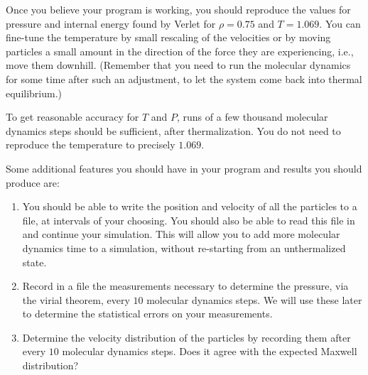 Once you believe your program is working, you should reproduce the values for pressure and
internal energy found by Verlet for $\rho = 0.75$ and $T = 1.069$. You can fine-tune the
temperature by small rescaling of the velocities or by moving particles a small amount in
the direction of the force they are experiencing, i.e., move them downhill. (Remember that
you need to run the molecular dynamics for some time after such an adjustment, to let the
system come back into thermal equilibrium.)

To get reasonable accuracy for $T$ and $P$, runs of a few thousand molecular dynamics steps
should be sufficient, after thermalization. You do not need to reproduce the temperature to
precisely $1.069$.

Some additional features you should have in your program and results you should produce are:

\begin{enumerate}
    \item You should be able to write the position and velocity of all the particles to a
          file, at intervals of your choosing. You should also be able to read this file in
          and continue your simulation. This will allow you to add more molecular dynamics
          time to a simulation, without re-starting from an unthermalized state.
    \item Record in a file the measurements necessary to determine the pressure, via the
          virial theorem, every $10$ molecular dynamics steps. We will use these later to
          determine the statistical errors on your measurements.
    \item Determine the velocity distribution of the particles by recording them after every
          $10$ molecular dynamics steps. Does it agree with the expected Maxwell distribution?
\end{enumerate}


